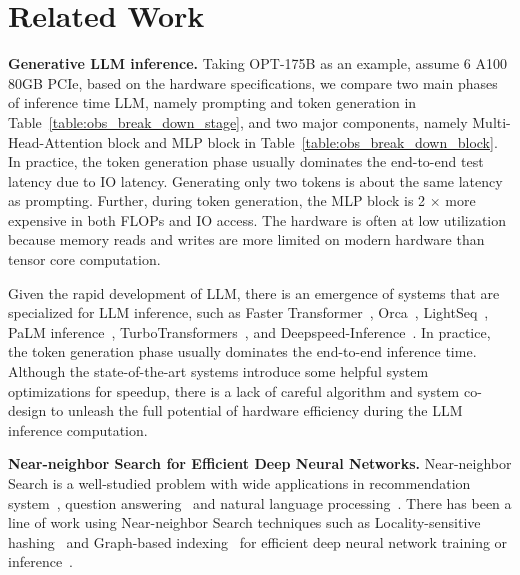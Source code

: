 \section{Related Work}
\label{appendix:related_work}
\textbf{Generative LLM inference.} Taking OPT-175B as an example, assume 6 A100 80GB PCIe, based on the hardware specifications, we compare two main phases of inference time LLM, namely prompting and token generation in Table~\ref{table:obs_break_down_stage}, and two major components, namely Multi-Head-Attention block and MLP block in Table~\ref{table:obs_break_down_block}. In practice, the token generation phase usually dominates the end-to-end test latency due to IO latency. Generating only two tokens is about the same latency as prompting. Further, during token generation, the MLP block is 2 $\times$ more expensive in both FLOPs and IO access. The hardware is often at low utilization because memory reads and writes are more limited on modern hardware than tensor core computation.


 Given the rapid development of LLM, there is an emergence of systems that are specialized for LLM inference, such as Faster Transformer~\cite{nvidiaft},  Orca~\cite{yu2022orca}, LightSeq~\cite{wang2021lightseq}, PaLM inference~\cite{pope2022efficiently}, TurboTransformers~\cite{fang2021turbotransformers}, and Deepspeed-Inference~\cite{aminabadi2022deepspeed}. In practice, the token generation phase usually dominates the end-to-end inference time. Although the state-of-the-art systems introduce some helpful system optimizations for speedup, there is a lack of careful algorithm and system co-design to unleash the full potential of hardware efficiency during the LLM inference computation.   

\textbf{Near-neighbor Search for Efficient Deep Neural Networks.} Near-neighbor Search is a well-studied problem with wide applications in recommendation system~\cite{ xue2017deep,hall2015fast}, question answering~\cite{boytsov2016off,seo2019real, chang2020pre} and natural language processing~\cite{bengio2003neural,lee2015reasoning}. There has been a line of work using Near-neighbor Search techniques such as Locality-sensitive hashing~\cite{gionis1999similarity} and Graph-based indexing~\cite{malkov2014approximate} for efficient deep neural network training or inference~\cite{zhang2018navigating,chen2019fast,chen2020slide,kkl20,chen2021mongoose,chen2021scatterbrain,liu2022halos}.



